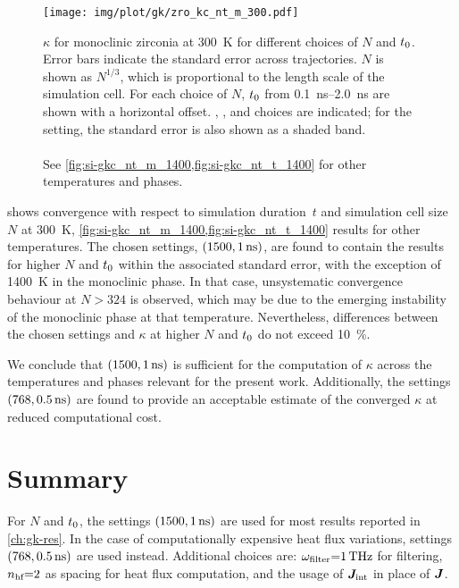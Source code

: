 \begin{figure*}
  \texttt{[image: img/plot/gk/zro\_kc\_nt\_m\_300.pdf]}
  \caption{
  $\kappa$ for monoclinic zirconia at \qty{300}{K} for different choices of $N$ and $t_0$.
  Error bars indicate the standard error across trajectories.
  $N$ is shown as $N^{1/3}$, which is proportional to the length scale of the simulation cell.
  For each choice of $N$, $t_0$ from \qtyrange{0.1}{2.0}{ns} are shown with a horizontal offset.
  , ,  and  choices are indicated; for the  setting, the standard error is also shown as a shaded band.
  \\\\
  See \cref{fig:si-gkc_nt_m_1400,fig:si-gkc_nt_t_1400} for other temperatures and phases.
  }
  \label{fig:gkc_nt}
\end{figure*}

\noindent
{} shows convergence with respect to simulation duration~$t$ and simulation cell size $N$ at \SI{300}{K}, \cref{fig:si-gkc_nt_m_1400,fig:si-gkc_nt_t_1400} results for other temperatures.
The chosen  settings, $(1500, \qty{1}{ns})$, are found to contain the results for higher $N$ and $t_0$ within the associated standard error, with the exception of \qty{1400}{K} in the monoclinic phase. In that case, unsystematic convergence behaviour at $N{>}324$ is observed, which may be due to the emerging instability of the monoclinic phase at that temperature.
Nevertheless, differences between the chosen settings and $\kappa$ at higher $N$ and $t_0$ do not exceed \qty{10}{\percent}.

We conclude that $(1500, \qty{1}{ns})$ is sufficient for the computation of $\kappa$ across the temperatures and phases relevant for the present work.
Additionally, the  settings $(768, \qty{0.5}{ns})$ are found to provide an acceptable estimate of the converged $\kappa$ at reduced computational cost.

\section{Summary}
\label{sec:gkc_sum}

For $N$ and $t_0$, the  settings $(1500, \qty{1}{ns})$ are used for most results reported in \cref{ch:gk-res}. In the case of computationally expensive heat flux variations,  settings $(768, \qty{0.5}{ns})$ are used instead.
Additional choices are: $\omega_{\text{filter}}{=}\qty{1}{THz}$ for filtering, $n_{\text{hf}}{=}2$ as spacing for heat flux computation, and the usage of $\boldsymbol{J}_\text{int}$ in place of $\boldsymbol{J}$.
